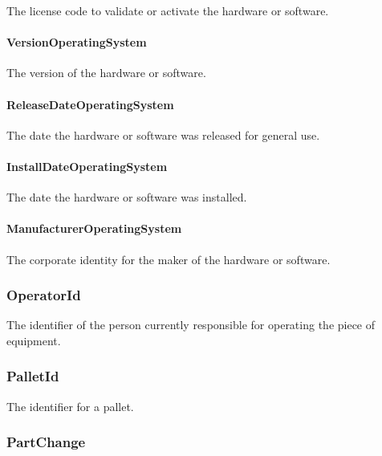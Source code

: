 The license code to validate or activate the hardware or software.


\paragraph{VersionOperatingSystem}\mbox{}
\label{sec:VersionOperatingSystem}


The version of the hardware or software.


\paragraph{ReleaseDateOperatingSystem}\mbox{}
\label{sec:ReleaseDateOperatingSystem}


The date the hardware or software was released for general use.



\paragraph{InstallDateOperatingSystem}\mbox{}
\label{sec:InstallDateOperatingSystem}


The date the hardware or software was installed.


\paragraph{ManufacturerOperatingSystem}\mbox{}
\label{sec:ManufacturerOperatingSystem}


The corporate identity for the maker of the hardware or software.



\subsubsection{OperatorId}
\label{sec:OperatorId}



The identifier of the person currently responsible for operating the piece of equipment.


\subsubsection{PalletId}
\label{sec:PalletId}



The identifier for a pallet.


\subsubsection{PartChange}
\label{sec:PartChange}




